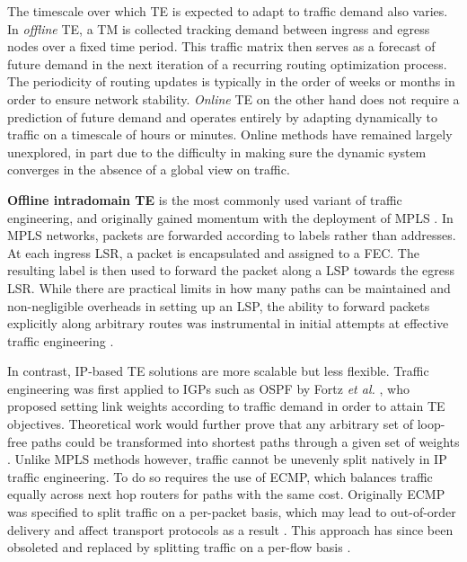 The timescale over which \ac{TE} is expected to adapt to traffic demand also varies.
In \emph{offline} \ac{TE}, a \ac{TM} is collected tracking demand between ingress and egress nodes over a fixed time period.
This traffic matrix then serves as a forecast of future demand in the next iteration of a recurring routing optimization process.
The periodicity of routing updates is typically in the order of weeks or months in order to ensure network stability.
\emph{Online} \ac{TE} on the other hand does not require a prediction of future demand and operates entirely by adapting dynamically to traffic on a timescale of hours or minutes.
Online methods have remained largely unexplored, in part due to the difficulty in making sure the dynamic system converges in the absence of a global view on traffic.

\textbf{Offline intradomain \ac{TE}} is the most commonly used variant of traffic engineering, and originally gained momentum with the deployment of \ac{MPLS} \cite{Rosen:2001p147}.
In \ac{MPLS} networks, packets are forwarded according to labels rather than addresses. 
At each ingress \ac{LSR}, a packet is encapsulated and assigned to a \ac{FEC}.
The resulting label is then used to forward the packet along a \ac{LSP} towards the egress \ac{LSR}.
While there are practical limits in how many paths can be maintained and non-negligible overheads in setting up an \ac{LSP}, the ability to forward packets explicitly along arbitrary routes was instrumental in initial attempts at effective traffic engineering \cite{Xiao:2000p502,YufeiWang:1999p222}.

In contrast, IP-based \ac{TE} solutions are more scalable but less flexible.
Traffic engineering was first applied to \acp{IGP} such as \ac{OSPF} by Fortz \emph{et al.} \cite{Fortz:2000p350,Fortz:2002p179}, who proposed setting link weights according to traffic demand in order to attain \ac{TE} objectives.
Theoretical work would further prove that any arbitrary set of loop-free paths could be transformed into shortest paths through a given set of weights \cite{Wang:2001p506}.
Unlike \ac{MPLS} methods however, traffic cannot be unevenly split natively in IP traffic engineering.
To do so requires the use of \ac{ECMP}, which balances traffic equally across next hop routers for paths with the same cost.
Originally \ac{ECMP} was specified to split traffic on a per-packet basis, which may lead to out-of-order delivery and affect transport protocols as a result \cite{Thaler:2000p154}.
This approach has since been obsoleted and replaced by splitting traffic on a per-flow basis \cite{Feldmann:2000p503}.

